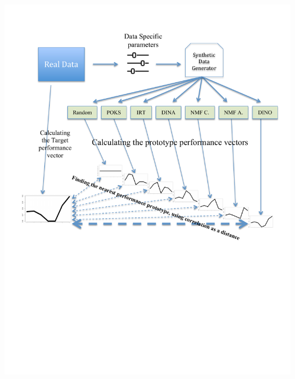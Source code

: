 \documentclass{beamer}
\begin{document}
\begin{frame}
\begin{overprint}
\begin{columns}
\begin{column}{0.3\textwidth}
		\end{column}
		\end{columns}
		 		\begin{columns}
		\begin{column}{0.7\textwidth}
			\vspace{-0.8cm}			
			\includegraphics[trim=1cm 10cm 1cm 1cm,scale=0.43]{images/Approach4.pdf}
		\end{column}
		\begin{column}{0.3\textwidth}
		\end{column}
		\end{columns}\end{overprint}
\end{frame}
\end{document}
